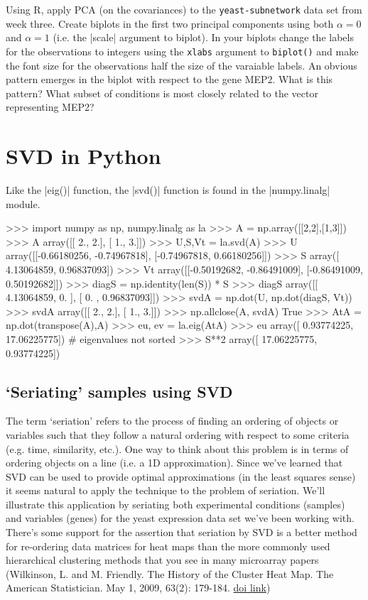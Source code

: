 \documentclass[11pt,letterpaper]{article}
\begin{document}
\begin{assignment}
Using R, apply PCA (on the covariances) to the \texttt{yeast-subnetwork} data set from week three. Create biplots in the first two principal components using both $\alpha=0$ and $\alpha=1$ (i.e. the |scale| argument to biplot). In your biplots change the labels for the observations to integers using the \texttt{xlabs} argument to \texttt{biplot()} and make the font size for the observations half the size of the varaiable labels.  An obvious pattern emerges in the biplot with respect to the gene MEP2. What is this pattern? What subset of conditions is most closely related to the vector representing MEP2?
\end{assignment}



\section*{SVD in Python}

Like the |eig()| function, the |svd()| function is found in the |numpy.linalg| module.

\begin{Pcode}
>>> import numpy as np, numpy.linalg as la
>>> A = np.array([[2,2],[1,3]])
>>> A
array([[ 2.,  2.],
       [ 1.,  3.]])
>>> U,S,Vt = la.svd(A)
>>> U
array([[-0.66180256, -0.74967818],
       [-0.74967818,  0.66180256]])
>>> S
array([ 4.13064859,  0.96837093])
>>> Vt
array([[-0.50192682, -0.86491009],
       [-0.86491009,  0.50192682]])
>>> diagS = np.identity(len(S)) * S
>>> diagS
array([[ 4.13064859,  0.        ],
       [ 0.        ,  0.96837093]])
>>> svdA = np.dot(U, np.dot(diagS, Vt))
>>> svdA
array([[ 2.,  2.],
       [ 1.,  3.]])
>>> np.allclose(A, svdA)
True
>>> AtA = np.dot(transpose(A),A)
>>> eu, ev = la.eig(AtA)
>>> eu
array([  0.93774225,  17.06225775]) # eigenvalues not sorted
>>> S**2
array([ 17.06225775,   0.93774225])
\end{Pcode}


\subsection*{`Seriating' samples using SVD}

The term `seriation' refers to the process of finding an ordering of objects or variables such that they follow a natural ordering with respect to some criteria (e.g. time, similarity, etc.). One way to think about this problem is in terms of ordering objects on a line (i.e. a 1D approximation).  Since we've learned that SVD can be used to provide optimal approximations (in the least squares sense) it seems natural to apply the technique to the problem of seriation. We'll illustrate this application by seriating both experimental conditions (samples) and variables (genes) for the yeast expression data set we've been working with.  There's some support for the assertion that seriation by SVD is a better method for re-ordering data matrices for heat maps than the more commonly used hierarchical clustering methods that you see in many microarray papers (Wilkinson, L. and M. Friendly. The History of the Cluster Heat Map. The American Statistician. May 1, 2009, 63(2): 179-184. \href{http://dx.doi.org/10.1198/tas.2009.0033}{doi link}) 
\end{document}
